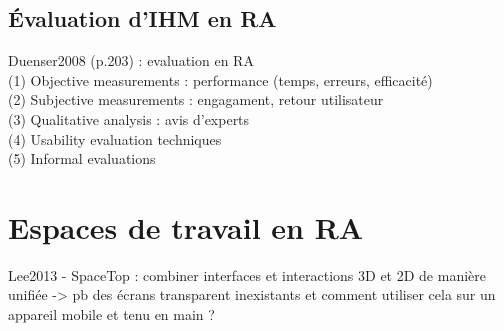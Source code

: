 
\subsection{Évaluation d'IHM en RA}
Duenser2008 (p.203) : evaluation en RA\\
(1) Objective measurements : performance (temps, erreurs, efficacité)\\
(2) Subjective measurements : engagament, retour utilisateur\\
(3) Qualitative analysis : avis d'experts\\
(4) Usability evaluation techniques\\
(5) Informal evaluations


\section{Espaces de travail en RA}
Lee2013 - SpaceTop : combiner interfaces et interactions 3D et 2D de manière unifiée -> pb des écrans transparent inexistants et comment utiliser cela sur un appareil mobile et tenu en main ?


